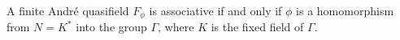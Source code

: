 A finite André quasifield $F_{\phi}$ is associative if and only if $\phi$ is a homomorphism from $N = K^*$ into the group $\Gamma$, where $K$ is the fixed field of $\Gamma$.

